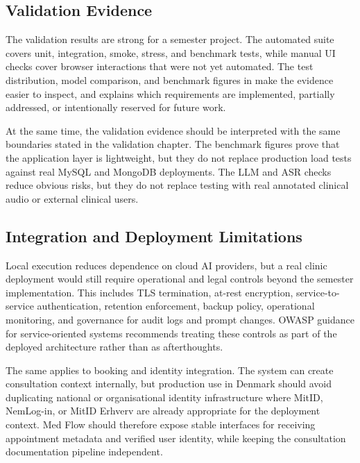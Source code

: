 \subsection{Validation Evidence}
\label{subsec:discussion-validation-evidence}

The validation results are strong for a semester project. The automated suite covers unit, integration, smoke, stress, and benchmark tests, while manual UI checks cover browser interactions that were not yet automated. The test distribution, model comparison, and benchmark figures in  make the evidence easier to inspect, and  explains which requirements are implemented, partially addressed, or intentionally reserved for future work.

At the same time, the validation evidence should be interpreted with the same boundaries stated in the validation chapter. The benchmark figures prove that the application layer is lightweight, but they do not replace production load tests against real MySQL and MongoDB deployments. The LLM and ASR checks reduce obvious risks, but they do not replace testing with real annotated clinical audio or external clinical users.

\subsection{Integration and Deployment Limitations}
\label{subsec:integration-deployment-limitations}

Local execution reduces dependence on cloud AI providers, but a real clinic deployment would still require operational and legal controls beyond the semester implementation. This includes TLS termination, at-rest encryption, service-to-service authentication, retention enforcement, backup policy, operational monitoring, and governance for audit logs and prompt changes. OWASP guidance for service-oriented systems recommends treating these controls as part of the deployed architecture rather than as afterthoughts.

The same applies to booking and identity integration. The system can create consultation context internally, but production use in Denmark should avoid duplicating national or organisational identity infrastructure where MitID, NemLog-in, or MitID Erhverv are already appropriate for the deployment context. Med Flow should therefore expose stable interfaces for receiving appointment metadata and verified user identity, while keeping the consultation documentation pipeline independent.

